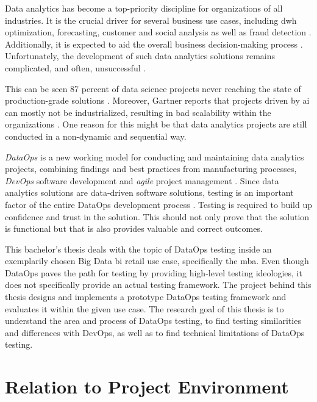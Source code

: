 
Data analytics has become a top-priority discipline for organizations of all industries. It is the crucial driver for several business use cases, including \ac{dwh} optimization, forecasting, customer and social analysis as well as fraud detection \cite{Statista}. Additionally, it is expected to aid the overall business decision-making process \cite{Souibgui2019}. Unfortunately, the development of such data analytics solutions remains complicated, and often, unsuccessful \cite{DataKitchen2019}.

This can be seen 87 percent of data science projects never reaching the state of production-grade solutions \cite{VentureBeat}. Moreover, Gartner reports that projects driven by \ac{ai} can mostly not be industrialized, resulting in bad scalability within the organizations \cite{White2019}. One reason for this might be that data analytics projects are still conducted in a non-dynamic and sequential way.

\textit{DataOps} is a new working model for conducting and maintaining data analytics projects, combining findings and best practices from manufacturing processes, \textit{DevOps} software development and \textit{agile} project management \cite[17\psqq]{Bergh2019}. Since data analytics solutions are data-driven software solutions, testing is an important factor of the entire DataOps development process \cite[40\psqq]{Bergh2019}. Testing is required to build up confidence and trust in the solution. This should not only prove that the solution is functional but that is also provides valuable and correct outcomes.

This bachelor's thesis deals with the topic of DataOps testing inside an exemplarily chosen Big Data \ac{bi} retail use case, specifically the \acf{mba}. Even though DataOps paves the path for testing by providing high-level testing ideologies, it does not specifically provide an actual testing framework. The project behind this thesis designs and implements a prototype DataOps testing framework and evaluates it within the given use case. The research goal of this thesis is to understand the area and process of DataOps testing, to find testing similarities and differences with DevOps, as well as to find technical limitations of DataOps testing.

\section*{Relation to Project Environment} \addtocounter{section}{1}
	
	\label{sec:1-relation}
	
